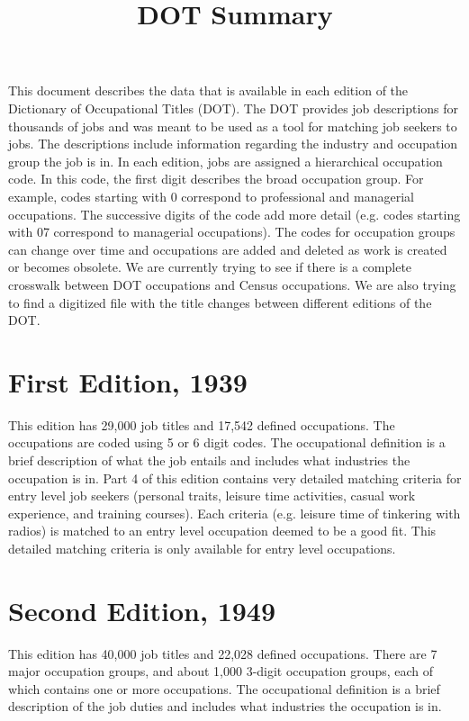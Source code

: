 \documentclass[11pt]{article}
\title{DOT Summary}
\begin{document}
\maketitle

This document describes the data that is available in each edition of the Dictionary of Occupational Titles (DOT). The DOT provides job descriptions for thousands of jobs and was meant to be used as a tool for matching job seekers to jobs. The descriptions include information regarding the industry and occupation group the job is in. In each edition, jobs are assigned a hierarchical occupation code. In this code, the first digit describes the broad occupation group. For example, codes starting with 0 correspond to professional and managerial occupations. The successive digits of the code add more detail (e.g. codes starting with 07 correspond to managerial occupations). The codes for occupation groups can change over time and occupations are added and deleted as work is created or becomes obsolete. We are currently trying to see if there is a complete crosswalk between DOT occupations and Census occupations. We are also trying to find a digitized file with the title changes between different editions of the DOT. 

\section*{First Edition, 1939}

This edition has 29,000 job titles and 17,542 defined occupations. The occupations are coded using 5 or 6 digit codes. The occupational definition is a brief description of what the job entails and includes what industries the occupation is in. Part 4 of this edition contains very detailed matching criteria for entry level job seekers (personal traits, leisure time activities, casual work experience, and training courses). Each criteria (e.g. leisure time of tinkering with radios) is matched to an entry level occupation deemed to be a good fit. This detailed matching criteria is only available for entry level occupations.

\section*{Second Edition, 1949}

This edition has 40,000 job titles and 22,028 defined occupations. There are 7 major occupation groups, and about 1,000 3-digit occupation groups, each of which contains one or more occupations. The occupational definition is a brief description of the job duties and includes what industries the occupation is in.
\end{document}
